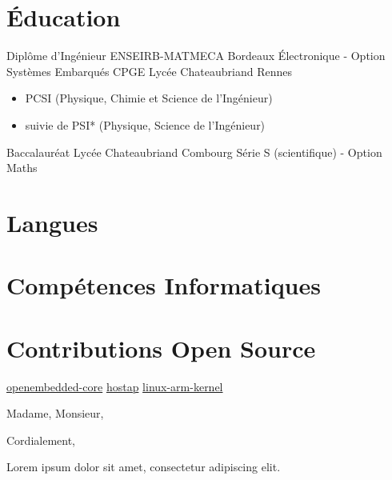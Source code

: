 \documentclass[11pt,a4paper,sans]{moderncv}
\begin{document}
\section{Éducation}
	{Diplôme d'Ingénieur}
	{ENSEIRB-MATMECA}
	{Bordeaux}
	{}
	{Électronique - Option Systèmes Embarqués}
	{CPGE}
	{Lycée Chateaubriand}
	{Rennes}
	{}
	{
		\begin{itemize}
		\item PCSI (Physique, Chimie et Science de l'Ingénieur)
		\item suivie de PSI* (Physique, Science de l'Ingénieur)
		\end{itemize}
	}
	{Baccalauréat}
	{Lycée Chateaubriand}
	{Combourg}
	{}
	{Série S (scientifique) - Option Maths}

\section{Langues}

\section{Compétences Informatiques}

\section{Contributions Open Source}
		 {\href{https://git.openembedded.org/openembedded-core/log/?qt=grep&q=lemetayer}{openembedded-core}}
		 {\href{https://w1.fi/cgit/hostap/log/?qt=grep&q=lemetayer}{hostap}}
		 {\href{http://lists.infradead.org/pipermail/linux-arm-kernel/2010-March/012556.html}{linux-arm-kernel}}

\clearpage

\date{01 Janvier, 2000}
\opening{Madame, Monsieur,}
\closing{Cordialement,}
\makelettertitle

Lorem ipsum dolor sit amet, consectetur adipiscing elit.

\makeletterclosing
\end{document}

